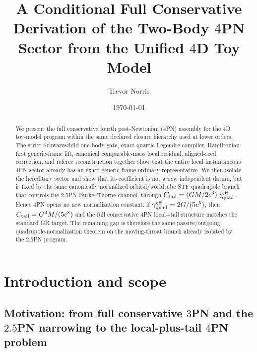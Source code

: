 \documentclass[11pt]{article}
\title{A Conditional Full Conservative Derivation of the Two-Body $4$PN Sector from the Unified $4$D Toy Model}
\author{Trevor Norris}
\date{\today}
\begin{document}
\maketitle

\begin{abstract}
We present the full conservative fourth post-Newtonian (4PN) assembly for the 4D toy-model program within the same declared closure hierarchy used at lower orders. The strict Schwarzschild one-body gate, exact quartic Legendre compiler, Hamiltonian-first generic-frame lift, canonical comparable-mass local residual, aligned-seed correction, and referee reconstruction together show that the entire local instantaneous 4PN sector already has an exact generic-frame ordinary representative. We then isolate the hereditary sector and show that its coefficient is not a new independent datum, but is fixed by the same canonically normalized orbital/worldtube STF quadrupole branch that controls the 2.5PN Burke--Thorne channel, through $C_{\rm tail}=(GM/2c^3)\,\gamma_{\rm quad}^{\rm eff}$. Hence 4PN opens no new normalization constant: if $\gamma_{\rm quad}^{\rm eff}=2G/(5c^5)$, then $C_{\rm tail}=G^2M/(5c^8)$ and the full conservative 4PN local+tail structure matches the standard GR target. The remaining gap is therefore the same passive/outgoing quadrupole-normalization theorem on the moving-throat branch already isolated by the 2.5PN program.
\end{abstract}



\section{Introduction and scope}
\label{sec:intro}

\subsection{Motivation: from full conservative \texorpdfstring{$3$}{3}PN and the \texorpdfstring{$2.5$}{2.5}PN narrowing to the local-plus-tail \texorpdfstring{$4$}{4}PN problem}
\label{sec:intro-motivation}
\end{document}

